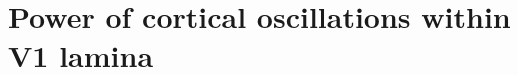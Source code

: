 \chapter{Power of cortical oscillations within V1 lamina}
\label{ch:lam}
\acresetall {} 

\graphicspath{{Chapters/laminar-chapter/}}

